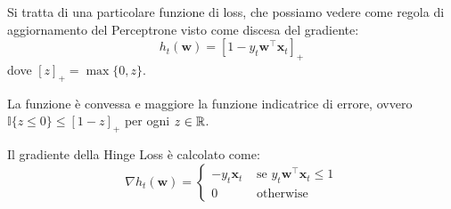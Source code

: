 \documentclass[\main/main.tex]{subfiles}
\begin{document}
\begin{multicols}{2}
    \begin{definition}
        Si tratta di una particolare funzione di loss, che possiamo vedere come regola di aggiornamento del Perceptrone visto come discesa del gradiente:
        \[h_{t}(\boldsymbol{w})=\left[1-y_{t} \boldsymbol{w}^{\top} \boldsymbol{x}_{t}\right]_{+}\]
        dove \([z]_{+}=\max \{0, z\}\).
        
        La funzione è convessa e maggiore la funzione indicatrice di errore, ovvero \(\mathbb{I}\{z \leq 0\} \leq[1-z]_{+}\) per ogni \(z \in \mathbb{R}\).
    \end{definition}
    \begin{observation}
        Il gradiente della Hinge Loss è calcolato come:
        \[
            \nabla h_{t}(\boldsymbol{w})=\left\{\begin{array}{cc}{-y_{t} \boldsymbol{x}_{t}} & {\text { se } y_{t} \boldsymbol{w}^{\top} \boldsymbol{x}_{t} \leq 1} \\ {0} & {\text { otherwise }}\end{array}\right.
        \]
    \end{observation}
\end{multicols}
\end{document}
